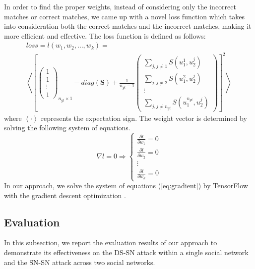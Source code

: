 \documentclass[letterpaper,12pt]{article}
\begin{document}
In order to find the proper weights, instead of considering only the incorrect matches or correct matches, we came up with a novel loss function which takes into consideration both the correct matches and the incorrect matches, making it more efficient and effective. The loss function is defined as follows:
%
\begin{equation}\label{eq:loss}
\begin{gathered}
loss=l(w_{1},w_{2},\ldots,w_{k})= \\
\left\langle \left[\left(\begin{array}{c}
1\\
1\\
\vdots\\
1
\end{array}\right)_{n_{gt}\times1}-diag(\boldsymbol{S})+\frac{1}{n_{gt}-1}\left(\begin{array}{c}
\underset{j,j\neq1}{\sum}S(u_{1}^{1},u_{2}^{j})\\
\underset{j,j\neq2}{\sum}S(u_{1}^{2},u_{2}^{j})\\
\vdots\\
\underset{j,j\neq n_{gt}}{\sum}S(u_{1}^{n_{gt}},u_{2}^{j})
\end{array}\right)\right]^{2}\right\rangle
\end{gathered}
\end{equation}
where $\left\langle \cdot \right\rangle$ represents the expectation sign. The weight vector is determined by solving the following system of equations.
\begin{equation}\label{eq:gradient}
\nabla l=0\Longrightarrow\begin{cases}
\frac{\partial l}{\partial w_{1}}=0\\
\frac{\partial l}{\partial w_{2}}=0\\
\vdots\\
\frac{\partial l}{\partial w_{k}}=0
\end{cases}
\end{equation}
In our approach, we solve the system of equations (\ref{eq:gradient}) by TensorFlow with the gradient descent optimization \cite{ruder2016overview}.

\subsection{Evaluation}
In this subsection, we report the evaluation results of our approach to demonstrate its effectiveness on the DS-SN attack within a single social network and the SN-SN attack across two social networks.
\end{document}
